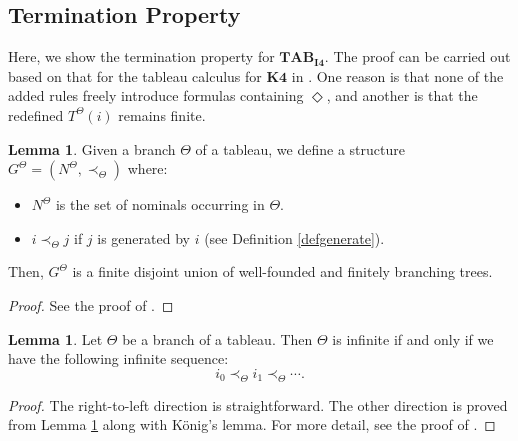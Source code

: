 \documentclass{article}
\theoremstyle{definition}
\newtheorem{lemma}[definition]{Lemma}
\newcommand{\Dia}{\Diamond}
\newcommand{\tableauIF}{\mathbf{TAB}_{\mathbf{I4}}}
\begin{document}
\subsection{Termination Property}
\label{subsecterm}

Here, we show the termination property for $\tableauIF$. The proof can be carried out based on that for the tableau calculus for $\mathbf{K4}$ in \cite{bolander2009}. One reason is that none of the added rules freely introduce formulas containing $\Dia$, and another is that the redefined $T^\Theta(i)$ remains finite.

\begin{lemma}
    Given a branch $\Theta$ of a tableau, we define a structure $G^\Theta = (N^\Theta, \prec_\Theta)$ where:
    \begin{itemize}
        \item $N^\Theta$ is the set of nominals occurring in $\Theta$.
        \item $i \prec_\Theta j$ if $j$ is generated by $i$ (see Definition \ref{defgenerate}).
    \end{itemize}
    Then, $G^\Theta$ is a finite disjoint union of well-founded and finitely branching trees.
    \label{lemG}
\end{lemma}
\begin{proof}
    See the proof of \cite[Lemma 6.4]{bolander2007}.
\end{proof}

\begin{lemma}
    Let $\Theta$ be a branch of a tableau. Then $\Theta$ is infinite if and only if we have the following infinite sequence:
    \[
        i_0 \prec_\Theta i_1 \prec_\Theta \cdots .
    \]
    \label{leminf}
\end{lemma}
\vspace{-2\baselineskip}
\begin{proof}
    The right-to-left direction is straightforward. The other direction is proved from Lemma \ref{lemG} along with K\"{o}nig's lemma. For more detail, see the proof of \cite[Lemma 6.5]{bolander2007}.
\end{proof}
\end{document}
